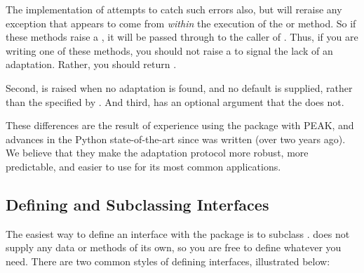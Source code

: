 The  implementation of  attempts to catch
such errors also, but will reraise any exception that appears to come from
\emph{within} the execution of the  or
 method.  So if these methods raise a ,
it will be passed through to the caller of .  Thus, if you
are writing one of these methods, you should not raise a 
to signal the lack of an adaptation.  Rather, you should return .

Second,  is raised when no adaptation is
found, and no default is supplied, rather than the 
specified by .  And third,  has an optional
 argument that the   does not.

These differences are the result of experience using the 
package with PEAK, and advances in the Python state-of-the-art since
 was written (over two years ago).  We believe that they make the
adaptation protocol more robust, more predictable, and easier to use for
its most common applications.






\subsection{Defining and Subclassing Interfaces \label{protocols-defining}}

The easiest way to define an interface with the  package is
to subclass .   does not supply any
data or methods of its own, so you are free to define whatever you need. There
are two common styles of defining interfaces, illustrated below:

